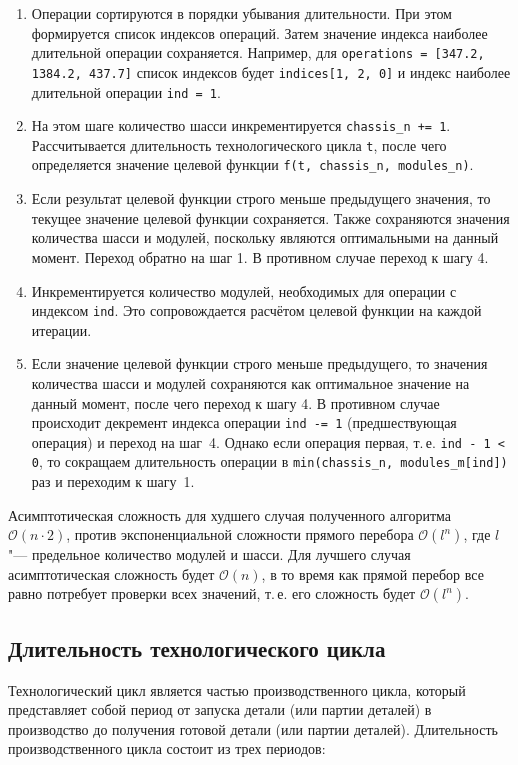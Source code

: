 \begin{enumerate}
	\item Операции сортируются в порядки убывания длительности. При этом формируется список индексов операций. Затем значение индекса наиболее длительной операции сохраняется. Например, для \texttt{operations = [347.2, 1384.2, 437.7]} список индексов будет \texttt{indices[1, 2, 0]} и индекс наиболее длительной операции \texttt{ind = 1}.
	\item На этом шаге количество шасси инкрементируется  \texttt{chassis\_n += 1}. Рассчитывается длительность технологического  цикла \texttt{t}, после чего определяется значение  целевой функции \texttt{f(t, chassis\_n, modules\_n)}.
	\item Если результат целевой функции строго меньше предыдущего значения, то  текущее значение целевой функции сохраняется. Также сохраняются значения количества шасси и модулей, поскольку являются  оптимальными на данный момент. Переход обратно на шаг 1. В противном случае переход к шагу 4.
	\item Инкрементируется количество модулей, необходимых для операции с индексом \texttt{ind}. Это сопровождается расчётом целевой функции на каждой итерации. 
	\item Если значение целевой функции строго меньше предыдущего, то значения количества шасси и модулей сохраняются как оптимальное значение на данный момент, после чего переход к шагу 4. В противном случае происходит декремент индекса операции \mbox{\texttt{ind -= 1}} (предшествующая операция) и переход на шаг~4. Однако если операция первая, т.\,е. \texttt{ind - 1 < 0}, то сокращаем длительность операции в \texttt{min(chassis\_n, modules\_m[ind])} раз и переходим к шагу~1.
\end{enumerate}

Асимптотическая сложность для худшего случая полученного алгоритма $\mathcal{O}(n \cdot 2)$, против экспоненциальной сложности прямого перебора $\mathcal{O}(l^n)$, где $l$ "--- предельное количество модулей и шасси.
Для лучшего случая асимптотическая сложность будет $\mathcal{O}(n)$, в то время как прямой перебор все равно потребует проверки всех значений, т.\,е. его сложность будет $\mathcal{O}(l^n)$.


\subsection{Длительность технологического цикла}

Технологический цикл является частью производственного цикла, который представляет собой период от запуска детали (или партии деталей) в производство до получения готовой детали (или партии деталей). Длительность производственного цикла состоит из трех периодов:

